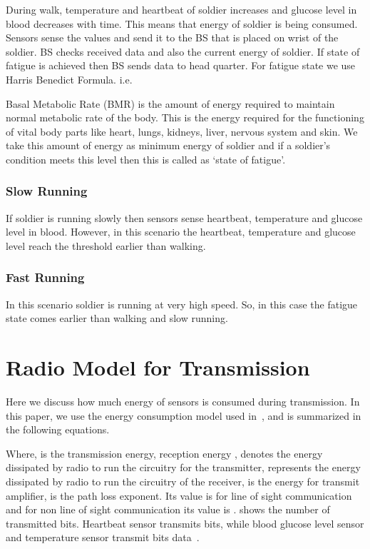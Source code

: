 \documentclass[journal]{IEEEtran}
\begin{document}
During walk, temperature and heartbeat of soldier increases and glucose level in blood decreases with time. This means that energy of soldier is being consumed.
Sensors sense the values and send it to the BS that is placed on wrist of the soldier. BS checks received data and also the current energy of soldier. If state of
 fatigue is achieved then BS sends data to head quarter. For fatigue state we use Harris Benedict Formula. i.e.






Basal Metabolic Rate (BMR) is the amount of energy required to maintain normal metabolic rate of the body. This is the energy required for the functioning of vital
body parts like heart, lungs, kidneys, liver, nervous system and skin. We take this amount of energy as minimum energy of soldier and if a soldier's condition meets
 this level then this is called as `state of fatigue'.
\subsubsection{Slow Running}
If soldier is running slowly then sensors sense heartbeat, temperature and glucose level in blood. However, in this scenario the heartbeat, temperature and glucose
level reach the threshold earlier than walking.
\subsubsection{Fast Running}
In this scenario soldier is running at very high speed. So, in this case the fatigue state comes earlier than walking and slow running.

\section{Radio Model for Transmission}
Here we discuss how much energy of sensors is consumed during transmission. In this paper, we use the energy consumption model used in~\cite{15}, and is summarized
 in the following equations.




Where,  is the transmission energy, reception energy ,  denotes the energy dissipated by radio to run the circuitry for the
transmitter,  represents the energy dissipated by radio to run the circuitry of the receiver,  is the energy for transmit amplifier,
 is the path loss exponent. Its value is  for line of sight communication and for non line of sight communication its value is .  shows the
 number of transmitted bits. Heartbeat sensor transmits  bits, while blood glucose level sensor and temperature sensor transmit  bits data~\cite{15}.
\end{document}
